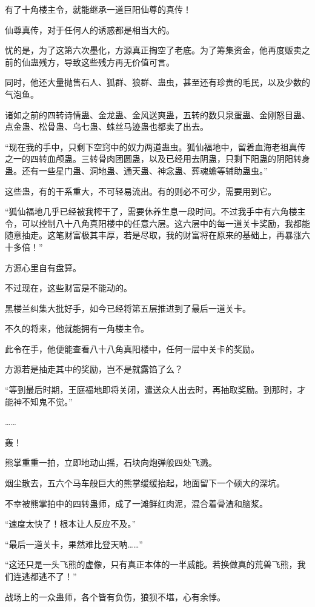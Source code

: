 \begin{this_body}
有了十角楼主令，就能继承一道巨阳仙尊的真传！

仙尊真传，对于任何人的诱惑都是相当大的。

忧的是，为了这第六次墨化，方源真正掏空了老底。为了筹集资金，他再度贩卖之前的仙蛊残方，导致这些残方再无价值可言。

同时，他还大量抛售石人、狐群、狼群、蛊虫，甚至还有珍贵的毛民，以及少数的气泡鱼。

诸如之前的四转诗情蛊、金龙蛊、金风送爽蛊，五转的数只泉蛋蛊、金刚怒目蛊、点金蛊、松骨蛊、乌七蛊、蛛丝马迹蛊也都卖了出去。

“现在我的手中，只剩下空窍中的奴力两道蛊虫。狐仙福地中，留着血海老祖真传之一的四转血颅蛊。三转骨肉团圆蛊，以及已经用去阴蛊，只剩下阳蛊的阴阳转身蛊。还有一些星门蛊、洞地蛊、通天蛊、神念蛊、葬魂蟾等辅助蛊虫。”

这些蛊，有的干系重大，不可轻易流出。有的则必不可少，需要用到它。

“狐仙福地几乎已经被我榨干了，需要休养生息一段时间。不过我手中有六角楼主令，可以控制八十八角真阳楼中的任意六层。这六层中的每一道关卡奖励，我都能随意抽走。这笔财富极其丰厚，若是尽取，我的财富将在原来的基础上，再暴涨六十多倍！”

方源心里自有盘算。

不过现在，这些财富是不能动的。

黑楼兰纠集大批好手，如今已经将第五层推进到了最后一道关卡。

不久的将来，他就能拥有一角楼主令。

此令在手，他便能查看八十八角真阳楼中，任何一层中关卡的奖励。

方源若是抽走其中的奖励，岂不是就露馅了么？

“等到最后时期，王庭福地即将关闭，遣送众人出去时，再抽取奖励。到那时，才能神不知鬼不觉。”

……

轰！

熊掌重重一拍，立即地动山摇，石块向炮弹般四处飞溅。

烟尘散去，五六个马车般巨大的熊掌缓缓抬起，地面留下一个硕大的深坑。

不幸被熊掌拍中的四转蛊师，成了一滩鲜红肉泥，混合着骨渣和脑浆。

“速度太快了！根本让人反应不及。”

“最后一道关卡，果然难比登天呐……”

“这还只是一头飞熊的虚像，只有真正本体的一半威能。若换做真的荒兽飞熊，我们连逃都逃不了！”

战场上的一众蛊师，各个皆有负伤，狼狈不堪，心有余悸。


\end{this_body}
